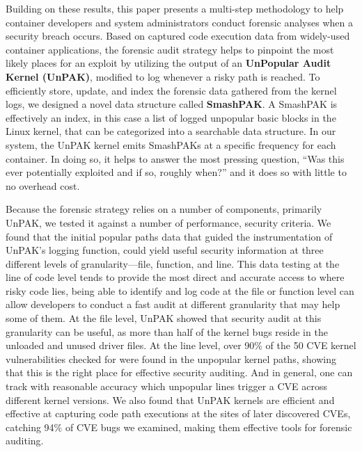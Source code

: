 Building on these results, this paper presents a multi-step methodology to help container developers and system administrators conduct forensic analyses when a security breach occurs. 
Based on captured code execution data from widely-used container applications, 
the forensic audit strategy helps to pinpoint the most likely places for an exploit by utilizing the output of an \textbf{UnPopular Audit Kernel (UnPAK)}, modified to log whenever a risky path is reached. 
To efficiently store, update, and index the forensic data gathered from the kernel logs, we designed a novel data structure called \textbf{SmashPAK}. 
A SmashPAK is effectively an index, in this case a list of logged unpopular basic blocks in the Linux kernel, that can be categorized into a searchable data structure. In our system, 
the UnPAK kernel emits SmashPAKs  at a specific frequency for each container. In doing so, it helps to answer the most pressing question, 
``Was this ever potentially exploited and if so, roughly when?'' and it does so with little to no overhead cost. 

Because the forensic strategy relies on a number of components, primarily UnPAK, we tested it against a number of performance, security criteria. 
We found that the initial popular paths data that guided the instrumentation of UnPAK’s logging function, could yield useful security information at three different levels of granularity—file, function, 
and line. This data testing at the line of code level tends to provide the most direct and accurate access to where risky code lies, being able to identify and log code at the file or function level can 
allow developers to conduct a fast audit at different granularity that may help some of them. At the file level, UnPAK showed that security audit at this granularity can be useful, 
as more than half of the kernel bugs reside in the unloaded and unused driver files. At the line level, over 90\% of the 50 CVE kernel vulnerabilities checked for were found in the unpopular kernel paths, 
showing that this is the right place for effective security auditing. And in general, one can track with reasonable accuracy which unpopular lines trigger a CVE across different kernel versions. 
We also found that UnPAK kernels are efficient and effective at capturing code path executions at the sites of later discovered CVEs, catching 94\% of CVE bugs we examined, 
making them effective tools for forensic auditing.

